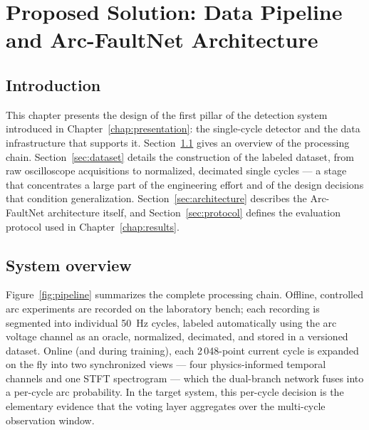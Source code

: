 \chapter{Proposed Solution: Data Pipeline and Arc-FaultNet Architecture}
\label{chap:design}

\section*{Introduction}

This chapter presents the design of the first pillar of the detection system introduced in Chapter~\ref{chap:presentation}: the single-cycle detector and the data infrastructure that supports it. Section~\ref{sec:overview} gives an overview of the processing chain. Section~\ref{sec:dataset} details the construction of the labeled dataset, from raw oscilloscope acquisitions to normalized, decimated single cycles --- a stage that concentrates a large part of the engineering effort and of the design decisions that condition generalization. Section~\ref{sec:architecture} describes the Arc-FaultNet architecture itself, and Section~\ref{sec:protocol} defines the evaluation protocol used in Chapter~\ref{chap:results}.

\section{System overview}
\label{sec:overview}

Figure~\ref{fig:pipeline} summarizes the complete processing chain. Offline, controlled arc experiments are recorded on the laboratory bench; each recording is segmented into individual 50~Hz cycles, labeled automatically using the arc voltage channel as an oracle, normalized, decimated, and stored in a versioned dataset. Online (and during training), each 2\,048-point current cycle is expanded on the fly into two synchronized views --- four physics-informed temporal channels and one STFT spectrogram --- which the dual-branch network fuses into a per-cycle arc probability. In the target system, this per-cycle decision is the elementary evidence that the voting layer aggregates over the multi-cycle observation window.

